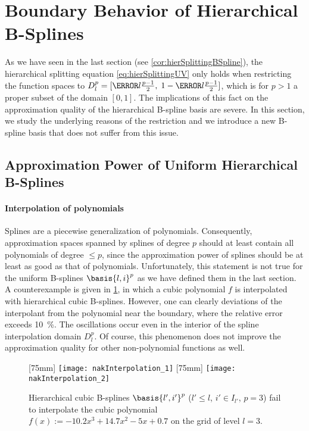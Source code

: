 \section{Boundary Behavior of Hierarchical B-Splines}
\label{sec:32notAKnot}

As we have seen in the last section (see \cref{cor:hierSplittingBSpline}),
the hierarchical splitting equation \eqref{eq:hierSplittingUV}
only holds when restricting the function spaces to
$D_l^p = [\ms{l} \tfrac{p-1}{2},\; 1 - \ms{l} \tfrac{p-1}{2}]$,
which is for $p > 1$ a proper subset of the domain $[0, 1]$.
The implications of this fact on the approximation quality
of the hierarchical B-spline basis are severe.
In this section, we study the underlying reasons of the restriction and
we introduce a new B-spline basis that does not suffer from this issue.



\subsection{Approximation Power of Uniform Hierarchical B-Splines}
\label{sec:321approximation}


\paragraph{Interpolation of polynomials}

Splines are a piecewise generalization of polynomials.
Consequently, approximation spaces spanned by splines of degree $p$ should
at least contain all polynomials of degree $\le p$,
since the approximation power of splines should be at least as good
as that of polynomials.
Unfortunately, this statement is not true for the uniform B-splines
$\basis{l,i}^p$ as we have defined them in the last section.
A counterexample is given in \cref{fig:nakInterpolation},
in which a cubic polynomial $f$ is interpolated with
hierarchical cubic B-splines.
However, one can clearly deviations of the interpolant from the polynomial
near the boundary, where the relative error exceeds \SI{10}{\percent}.
The oscillations occur even in the interior of the
spline interpolation domain $D_l^p$.
Of course, this phenomenon does not improve the approximation quality
for other non-polynomial functions as well.

\begin{figure}
  [75mm]{%
    \texttt{[image: nakInterpolation\_1]}%
  }%
  \hfill%
  [75mm]{%
    \texttt{[image: nakInterpolation\_2]}%
  }%
  \caption{%
    Hierarchical cubic B-splines $\basis{l',i'}^p$
    ($l' \le l$, $i' \in I_{l'}$, $p = 3$)
    fail to interpolate the cubic polynomial
    $f(x) := -10.2 x^3 + 14.7 x^2 - 5x + 0.7$
    on the grid of level $l = 3$.%
  }
  \label{fig:nakInterpolation}
\end{figure}

